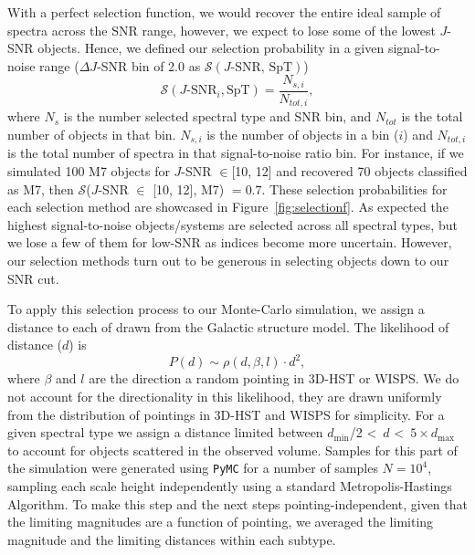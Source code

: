 \documentclass[manuscript]{aastex63}
\begin{document}
With a perfect selection function, we would recover the entire ideal sample of spectra across the SNR range, however, we expect to lose some of the lowest $J$-SNR objects. Hence, we defined our selection probability in a given signal-to-noise range ($\Delta J$-SNR bin of 2.0 as $\mathcal{S}(J\text{-SNR, SpT})$)
\begin{equation}\label{equasl}
\mathcal{S}(J\text{-SNR}_i, \text{SpT})= \frac{N_{s, i} }{N_{tot, i}},
\end{equation} 
where $N_s$ is the number selected spectral type and SNR bin, and $N_{tot}$ is the total number of objects in that bin. $N_{s, i}$ is the number of objects in a bin ($i$) and $N_{tot, i}$ is the total number of spectra in that signal-to-noise ratio bin. For instance, if we simulated 100 M7 objects for $J$-SNR $\in$[10, 12] and recovered 70 objects classified as M7, then $\mathcal{S}$($J$-SNR $\in$ [10, 12], M7) $=0.7$. These selection probabilities for each selection method are showcased in Figure~\ref{fig:selectionf}. As expected the highest signal-to-noise objects/systems are selected across all spectral types, but we lose a few of them for low-SNR as indices become more uncertain. However, our selection methods turn out to be generous in selecting objects down to our SNR cut.

To apply this selection process to our Monte-Carlo simulation, we assign a distance to each of drawn from the Galactic structure model. The likelihood of distance ($d$) is 
\begin{equation}  
P(d) \sim \rho (d, \beta, l) \cdot d^2, 
\end{equation} 
where $\beta$ and $l$ are the direction a random pointing in 3D-HST or WISPS. We do not account for the directionality in this likelihood, they are drawn uniformly from the distribution of pointings in 3D-HST and WISPS for simplicity. For a given spectral type we assign a distance limited between $d_\mathrm{min}$/2 \textless\ $d$ \textless\ $5 \times d_\mathrm{max}$ to account for objects scattered in the observed volume. Samples for this part of the simulation were generated using \texttt{PyMC} for a number of samples $N=10^4$, sampling each scale height independently using a standard Metropolis-Hastings Algorithm. To make this step and the next steps pointing-independent, given that the limiting magnitudes are a function of pointing, we averaged the limiting magnitude and the limiting distances within each subtype.
\end{document}
